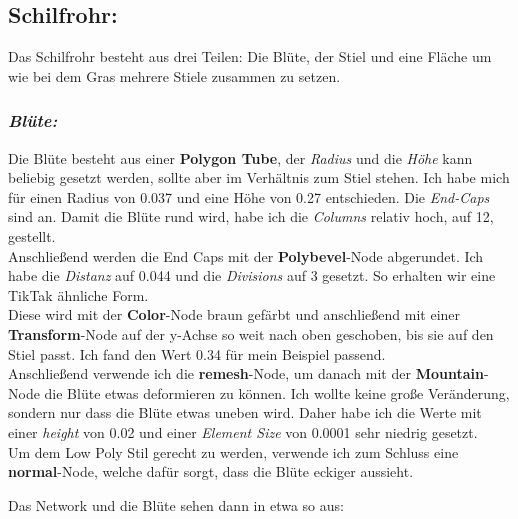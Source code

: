 \documentclass[paper=a4,fontsize=12pt,ngerman]{scrartcl}
\begin{document}
	\subsection*{Schilfrohr:}
	Das Schilfrohr besteht aus drei Teilen: Die Blüte, der Stiel und eine Fläche um wie bei dem Gras mehrere Stiele zusammen zu setzen.
	\subsubsection*{\textit{Blüte:}}
	Die Blüte besteht aus einer \textbf{Polygon Tube}, der \textit{Radius} und die \textit{Höhe} kann beliebig gesetzt werden, sollte aber im Verhältnis zum Stiel stehen. Ich habe mich für einen Radius von 0.037 und eine Höhe von 0.27 entschieden. Die \textit{End-Caps} sind an. Damit die Blüte rund wird, habe ich die \textit{Columns} relativ hoch, auf 12, gestellt.\\
	Anschließend werden die End Caps mit der \textbf{Polybevel}-Node abgerundet. Ich habe die \textit{Distanz} auf 0.044 und die \textit{Divisions} auf 3 gesetzt. So erhalten wir eine TikTak ähnliche Form.\\ 
	Diese wird mit der \textbf{Color}-Node braun gefärbt und anschließend mit einer \textbf{Transform}-Node auf der y-Achse so weit nach oben geschoben, bis sie auf den Stiel passt. Ich fand den Wert 0.34 für mein Beispiel passend.\\ 
	Anschließend verwende ich die \textbf{remesh}-Node, um danach mit der \textbf{Mountain}-Node die Blüte etwas deformieren zu können. Ich wollte keine große Veränderung, sondern nur dass die Blüte etwas uneben wird. Daher habe ich die Werte mit einer \textit{height} von 0.02 und einer \textit{Element Size} von 0.0001 sehr niedrig gesetzt.\\ 
	Um dem Low Poly Stil gerecht zu werden, verwende ich zum Schluss eine \textbf{normal}-Node, welche dafür sorgt, dass die Blüte eckiger aussieht.\\
	\begin{minipage}{0.5\textwidth}
		Das Network und die Blüte sehen dann in etwa so aus:
	\end{minipage}
\end{document}

